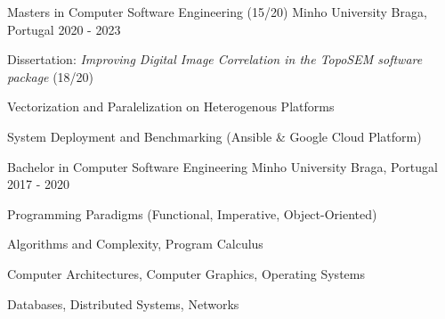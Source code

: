 
\begin{cventries}


\cventry
  {Masters in Computer Software Engineering (15/20)} %
{Minho University} %
{Braga, Portugal} %
{2020 - 2023} %
{ %
\begin{cvitems}
\item{Dissertation: \textit{Improving Digital Image Correlation in the TopoSEM software package} (18/20)}
\item{Vectorization and Paralelization on Heterogenous Platforms}
\item{System Deployment and Benchmarking (Ansible \& Google Cloud Platform)}
\end{cvitems}
}


\cventry
  {Bachelor in Computer Software Engineering} %
{Minho University} %
{Braga, Portugal} %
{2017 - 2020} %
{ %
\begin{cvitems}
\item{Programming Paradigms (Functional, Imperative, Object-Oriented)}
\item{Algorithms and Complexity, Program Calculus}
\item{Computer Architectures, Computer Graphics, Operating Systems}
\item{Databases, Distributed Systems, Networks}
\end{cvitems}
}



\end{cventries}
